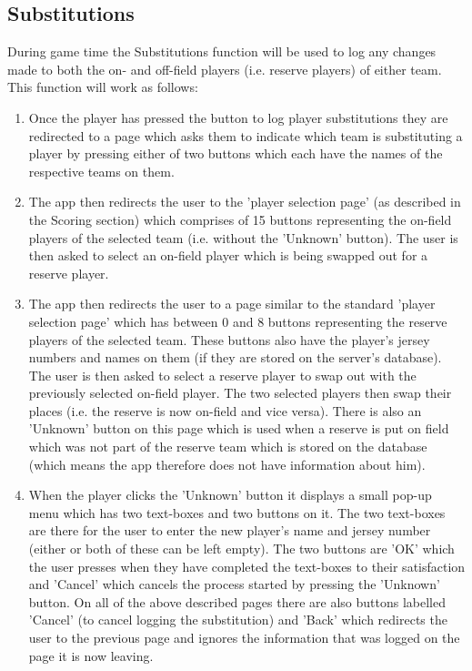 \documentclass[hidelinks,a4paper,12pt]{article}
\begin{document}
	\subsection{Substitutions}
		During game time the Substitutions function will be used to log any changes made to both the on- and off-field players (i.e. reserve players) of either team. This function will work as follows:
		\begin{enumerate}
			\item Once the player has pressed the button to log player substitutions they are redirected to a page which asks them to indicate which team is substituting a player by pressing either of two buttons which each have the names of the respective teams on them.
			\item The app then redirects the user to the 'player selection page' (as described in the Scoring section) which comprises of 15 buttons representing the on-field players of the selected team (i.e. without the 'Unknown' button). The user is then asked to select an on-field player which is being swapped out for a reserve player.
			\item The app then redirects the user to a page similar to the standard 'player selection page' which has between 0 and 8 buttons representing the reserve players of the selected team. These buttons also have the player's jersey numbers and names on them (if they are stored on the server's database). The user is then asked to select a reserve player to swap out with the previously selected on-field player. The two selected players then swap their places (i.e. the reserve is now on-field and vice versa). There is also an 'Unknown' button on this page which is used when a reserve is put on field which was not part of the reserve team which is stored on the database (which means the app therefore does not have information about him).
			\item When the player clicks the 'Unknown' button it displays a small pop-up menu which has two text-boxes and two buttons on it. The two text-boxes are there for the user to enter the new player's name and jersey number (either or both of these can be left empty). The two buttons are 'OK' which the user presses when they have completed the text-boxes to their satisfaction and 'Cancel' which cancels the process started by pressing the 'Unknown' button.
	On all of the above described pages there are also buttons labelled 'Cancel' (to cancel logging the substitution) and 'Back' which redirects the user to the previous page and ignores the information that was logged on the page it is now leaving.
		\end{enumerate}
\end{document}

